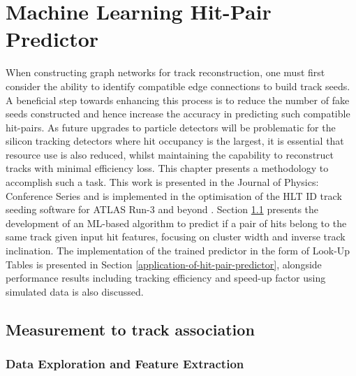 

\doublespacing
\newpage
\chapter{Machine Learning Hit-Pair Predictor} 
\label{chapter-4}

When constructing graph networks for track reconstruction, one must first consider the ability to identify compatible edge connections to build track seeds. A beneficial step towards enhancing this process is to reduce the number of fake seeds constructed and hence increase the accuracy in predicting such compatible hit-pairs. As future upgrades to particle detectors will be problematic for the silicon tracking detectors where hit occupancy is the largest, it is essential that resource use is also reduced, whilst maintaining the capability to reconstruct tracks with minimal efficiency loss. This chapter presents a methodology to accomplish such a task. This work is presented in the Journal of Physics: Conference Series \cite{Lad_2023} and is implemented in the optimisation of the HLT ID track seeding software for ATLAS Run-3 and beyond \cite{Grandi:2728111, Long:2813981}. Section \ref{measurement-to-track-association} presents the development of an ML-based algorithm to predict if a pair of hits belong to the same track given input hit features, focusing on cluster width and inverse track inclination. The implementation of the trained predictor in the form of Look-Up Tables is presented in Section \ref{application-of-hit-pair-predictor}, alongside performance results including tracking efficiency and speed-up factor using simulated data is also discussed.


\section{Measurement to track association}
\label{measurement-to-track-association}

\subsection{Data Exploration and Feature Extraction}

